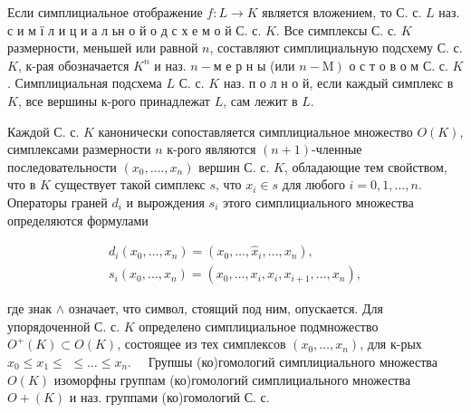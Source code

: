 \documentclass[10pt]{article}
\begin{document}
Если симплициальное отображение $f: L \rightarrow K$ является вложением, то С. с. $L$ наз. с и м ї л и ц и а л ьн о й $о$ д с х е м о й С. с. $K$. Все симплексы С. с. $K$ размерности, меньшей или равной $n$, составляют симплициальную подсхему С. с. $K$, к-рая обозначается $K^{n}$ и наз. $n-\mathbf{м}$ е р н ы (или $\left.n-\mathrm{M}\right)$ о с т о в о м С. с. $K$. Симплициальная подсхема $L$ С. с. $K$ наз. п о л н о й, если каждый симплекс в $K$, все вершины к-рого принадлежат $L$, сам лежит в $L$.



Каждой С. с. $K$ канонически сопоставляется симплициальное множество $O(K)$, симплексами размерности $n$ к-рого являются $(n+1)$-членные последовательности $\left(x_{0}, \ldots ., x_{n}\right)$ вершин С. с. $K$, обладающие тем свойством, что в $K$ существует такой симплекс $s$, что $x_{i} \in s$ для любого $i=0,1, \ldots, n$. Операторы граней $d_{i}$ и вырождения $s_{i}$ этого симплициального множества определяются формулами



\[

\begin{gathered}

d_{i}\left(x_{0}, \ldots, x_{n}\right)=\left(x_{0}, \ldots, \hat{x}_{i}, \ldots, x_{n}\right), \\

s_{i}\left(x_{0}, \ldots, x_{n}\right)=\left(x_{0}, \ldots, x_{i}, x_{i}, x_{i+1}, \ldots, x_{n}\right),

\end{gathered}

\]



где знак $\wedge$ означает, что символ, стоящий под ним, опускается. Для упорядоченной С. с. $K$ определено симплициальное подмножество $O^{+}(K) \subset O(K)$, состоящее из тех симплексов $\left(x_{0}, \ldots, x_{n}\right)$, для к-рых $x_{0} \leqslant x_{1} \leqslant$ $\leqslant \ldots \leqslant x_{n} . \quad$ Групшы (ко)гомологий симплициального множества $O(K)$ изоморфны группам (ко)гомологий симплициального множества $O+(K)$ и наз. группами (ко)гомологий С. с.
\end{document}
